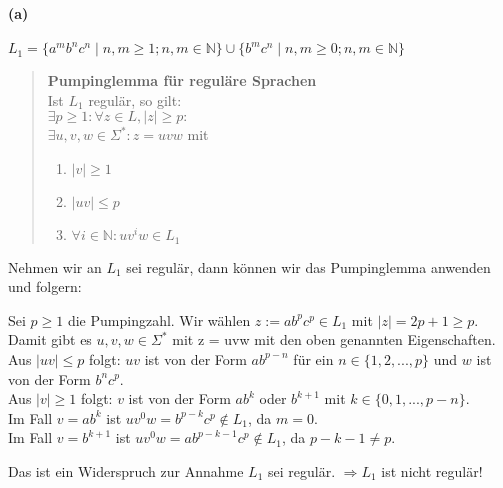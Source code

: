 
\paragraph{(a)}
	$L_1 = \{a^mb^nc^n \mid n,m \geq 1; n,m \in \mathbb{N} \} \cup \{ b^m c^n \mid n,m \geq 0; n,m \in \mathbb{N}\}$	
	
	\begin{quote}
	\textbf{Pumpinglemma für reguläre Sprachen} \\
    Ist $L_1$ regulär, so gilt: \\
    $\exists p \geq 1: \forall z \in L, |z| \geq p:$ \\
    $\exists u,v,w \in \Sigma^*: z = uvw$ mit
    \begin{enumerate}
    	\item $|v|  \geq 1$
    	\item $|uv| \leq p$
    	\item $\forall i \in \mathbb{N} : uv^{i}w \in L_1$
    \end{enumerate}
	\end{quote}
	
	Nehmen wir an $L_1$ sei regulär, dann können wir das Pumpinglemma anwenden und folgern:
	
	Sei $p \geq 1$ die Pumpingzahl. Wir wählen $z := ab^pc^p \in L_1$ mit $|z| = 2p+1 \geq p$.\\ Damit gibt es $u,v,w \in \Sigma^*$ mit z = uvw mit den oben genannten Eigenschaften.
	Aus $|uv| \leq p$ folgt: $uv$ ist von der Form $ab^{p-n}$ für ein $n \in \{1,2,...,p\}$ und $w$ ist von der Form $b^nc^p$.\\
	Aus $|v|  \geq 1$ folgt: $v$ ist von der Form $ab^k$ oder $b^{k+1}$ mit $k \in \{0,1,...,p-n\}$.\\
	Im Fall $v=ab^k$ ist $uv^0w=b^{p-k}c^p \notin L_1$, da $m=0$.\\
	Im Fall $v=b^{k+1}$ ist $uv^0w=ab^{p-k-1}c^p \notin L_1$, da $p-k-1\neq p$.
	
	Das ist ein Widerspruch zur Annahme $L_1$ sei regulär. $\Rightarrow L_1$ ist nicht regulär!
    
    \vspace{0.3cm}
	
